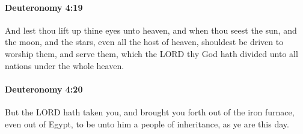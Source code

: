 		\paragraph{Deuteronomy 4:19} %
			\label{DEUTERONOMY-4-19}

			And lest thou lift up thine eyes unto heaven, and when thou seest the sun, and the moon, and the stars, even all the host of heaven, shouldest be driven to worship them, and serve them, which the LORD thy God hath divided unto all nations under the whole heaven.


		\paragraph{Deuteronomy 4:20} %
			\label{DEUTERONOMY-4-20}

			But the LORD hath taken you, and brought you forth out of the iron furnace, even out of Egypt, to be unto him a people of inheritance, as ye are this day.

